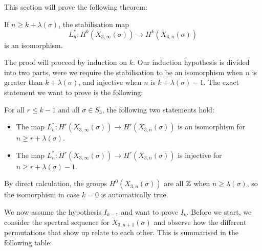 This section will prove the following theorem:
\begin{theorem}
  If $n \geq k + \lambda(\sigma)$, the stabilisation map
  \[ L_{n}^* : H^k(X_{3,\infty}(\sigma)) \to H^k(X_{3,n}(\sigma)) \]
  is an isomorphism. 
\end{theorem}

The proof will proceed by induction on $k$. Our induction hypothesis
is divided into two parts, were we require the stabilisation to be an
isomorphism when $n$ is greater than $k+\lambda(\sigma)$, and
injective when $n$ is $k+\lambda(\sigma)-1$. The exact statement we
want to prove is the following:
\begin{hypothesis}[$I_{k-1}$]
  For all $r \leq k-1$ and all $\sigma \in S_3$, the following two
  statements hold:
  \begin{itemize}
  \item The map $L_{n}^* : H^r(X_{3,\infty}(\sigma)) \to
    H^r(X_{3,n}(\sigma))$ is an isomorphism for $n \geq r +
    \lambda(\sigma)$.
  \item The map $L_{n}^* : H^r(X_{3,\infty}(\sigma)) \to
    H^r(X_{3,n}(\sigma))$ is injective for $n \geq r +\lambda(\sigma)
    -1$.
  \end{itemize}
\end{hypothesis}

By direct calculation, the
groups $H^0(X_{3,n}(\sigma))$ are all $\mathbb{Z}$ when $n \geq
\lambda(\sigma)$, so the isomorphism in case $k = 0$ is automatically
true. 

We now assume the hypothesis $I_{k-1}$ and want to prove $I_k$. Before
we start, we consider the spectral sequence for $X_{3,n+1}(\sigma)$
and observe how the different permutations that show up relate to each
other. This is summarised in the following table:

